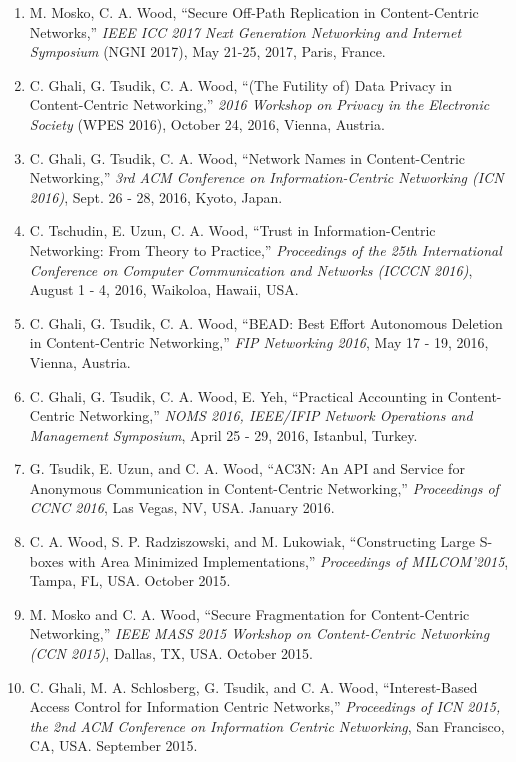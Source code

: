 \documentclass[10pt]{res} %
\begin{document}
\begin{resume}
\begin{enumerate}[C-1.]
\item M. Mosko, C. A. Wood, ``Secure Off-Path Replication in Content-Centric Networks,'' \emph{IEEE ICC 2017 Next Generation Networking and Internet Symposium} (NGNI 2017), May 21-25, 2017, Paris, France.

\item C. Ghali, G. Tsudik, C. A. Wood, ``(The Futility of) Data Privacy in Content-Centric Networking,'' \emph{2016 Workshop on Privacy in the Electronic Society} (WPES 2016), October 24, 2016, Vienna, Austria.

\item C. Ghali, G. Tsudik, C. A. Wood, ``Network Names in Content-Centric Networking,'' \emph{3rd ACM Conference on Information-Centric Networking (ICN 2016)}, Sept. 26 - 28, 2016, Kyoto, Japan.

\item C. Tschudin, E. Uzun, C. A. Wood, ``Trust in Information-Centric Networking: From Theory to Practice,'' \emph{Proceedings of the 25th International Conference on Computer Communication and Networks (ICCCN 2016)}, August 1 - 4, 2016, Waikoloa, Hawaii, USA.

\item C. Ghali, G. Tsudik, C. A. Wood, ``BEAD: Best Effort Autonomous Deletion in Content-Centric Networking,'' \emph{FIP Networking 2016}, May 17 - 19, 2016, Vienna, Austria.

\item C. Ghali, G. Tsudik, C. A. Wood, E. Yeh, ``Practical Accounting in Content-Centric Networking,''  \emph{NOMS 2016, IEEE/IFIP Network Operations and Management Symposium}, April 25 - 29, 2016, Istanbul, Turkey.

\item G. Tsudik, E. Uzun, and C. A. Wood, ``AC3N: An API and Service for Anonymous Communication in Content-Centric Networking,'' \emph{Proceedings of CCNC 2016}, Las Vegas, NV, USA. January 2016.

\item C. A. Wood, S. P. Radziszowski, and M. Lukowiak, ``Constructing Large S-boxes with Area Minimized Implementations,'' \emph{Proceedings of MILCOM'2015}, Tampa, FL, USA. October 2015.

\item M. Mosko and C. A. Wood, ``Secure Fragmentation for Content-Centric Networking,'' \emph{IEEE MASS 2015 Workshop on Content-Centric Networking (CCN 2015)}, Dallas, TX, USA. October 2015.

\item C. Ghali, M. A. Schlosberg, G. Tsudik, and C. A. Wood, ``Interest-Based Access Control for Information Centric Networks,'' \emph{Proceedings of ICN 2015, the 2nd ACM Conference on Information Centric Networking}, San Francisco, CA, USA. September 2015.


\end{enumerate}
\end{resume}
\end{document}
